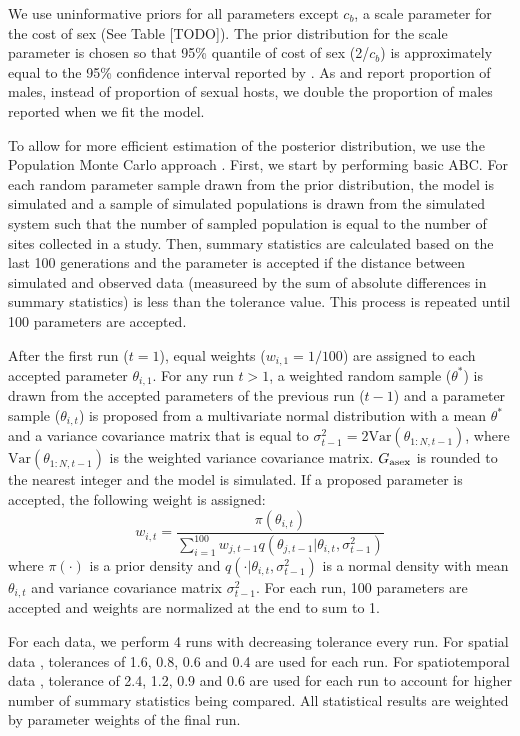 \documentclass{article}\usepackage[]{graphicx}\usepackage[]{color}
\begin{document}
We use uninformative priors for all parameters except $c_b$, a scale parameter for the cost of sex (See Table [TODO]).
The prior distribution for the scale parameter is chosen so that 95\% quantile of cost of sex (2/$c_b$) is approximately equal to the 95\% confidence interval reported by \cite{gibson2017two}.
As \cite{dagan2013clonal} and \cite{mckone2016fine} report proportion of males, instead of proportion of sexual hosts, we double the proportion of males reported when we fit the model.

To allow for more efficient estimation of the posterior distribution, we use the Population Monte Carlo approach \cite{turner2012tutorial}.
First, we start by performing basic ABC.
For each random parameter sample drawn from the prior distribution, the model is simulated and a sample of simulated populations is drawn from the simulated system such that the number of sampled population is equal to the number of sites collected in a study.
Then, summary statistics are calculated based on the last 100 generations and the parameter is accepted if the distance between simulated and observed data (measureed by the sum of absolute differences in summary statistics) is less than the tolerance value.
This process is repeated until 100 parameters are accepted.

After the first run ($t=1$), equal weights ($w_{i,1}=1/100$) are assigned to each accepted parameter $\theta_{i, 1}$.
For any run $t > 1$,
a weighted random sample ($\theta^\ast$) is drawn from the accepted parameters of the previous run ($t-1$) and
a parameter sample ($\theta_{i, t}$) is proposed from a multivariate normal distribution with a mean $\theta^\ast$ and a variance covariance matrix that is equal to $\sigma_{t-1}^2=2 \mathrm{Var}(\theta_{1:N, t-1})$, where $\mathrm{Var}(\theta_{1:N, t-1})$ is the weighted variance covariance matrix.
$G_{\tiny\textrm{asex}}$ is rounded to the nearest integer and the model is simulated.
If a proposed parameter is accepted, the following weight is assigned:
$$
w_{i,t} = \frac{\pi(\theta_{i, t})}{\sum_{i=1}^{100} w_{j, t-1} q(\theta_{j, t-1} | \theta_{i,t}, \sigma_{t-1}^2)}
$$
where $\pi(\cdot)$ is a prior density and $q(\cdot | \theta_{i,t}, \sigma_{t-1}^2)$ is a normal density with mean $\theta_{i,t}$ and variance covariance matrix $\sigma_{t-1}^2$.
For each run, 100 parameters are accepted and weights are normalized at the end to sum to 1.

For each data, we perform 4 runs with decreasing tolerance every run.
For spatial data \citep{dagan2013clonal, mckone2016fine}, tolerances of 1.6, 0.8, 0.6 and 0.4 are used for each run.
For spatiotemporal data \citep{vergara2014infection}, tolerance of 2.4, 1.2, 0.9 and 0.6 are used for each run to account for higher number of summary statistics being compared.
All statistical results are weighted by parameter weights of the final run.
\end{document}
